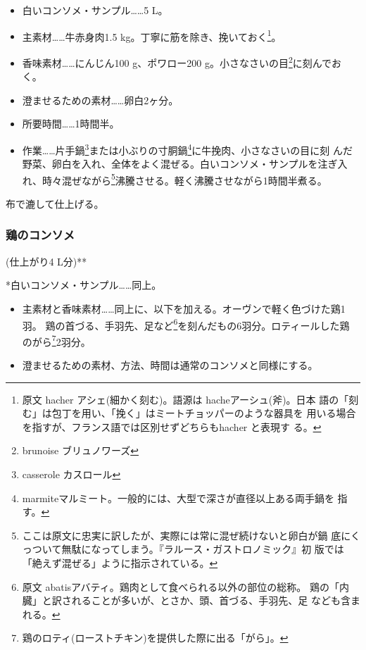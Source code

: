 \begin{itemize}
\item
  白いコンソメ・サンプル\ldots{}\ldots{}5 L。
\item
  主素材\ldots{}\ldots{}牛赤身肉1.5
  kg。丁寧に筋を除き、挽いておく\footnote{原文 hacher
    アシェ(細かく刻む)。語源は hacheアーシュ(斧)。日本
    語の「刻む」は包丁を用い、「挽く」はミートチョッパーのような器具を
    用いる場合を指すが、フランス語では区別せずどちらもhacher と表現す
    る。}。
\item
  香味素材\ldots{}\ldots{}にんじん100 g、ポワロー200
  g。小さなさいの目\footnote{brunoise ブリュノワーズ}に刻んでおく。
\item
  澄ませるための素材\ldots{}\ldots{}卵白2ヶ分。
\item
  所要時間\ldots{}\ldots{}1時間半。
\item
  作業\ldots{}\ldots{}片手鍋\footnote{casserole カスロール}または小ぶりの寸胴鍋\footnote{marmiteマルミート。一般的には、大型で深さが直径以上ある両手鍋を
    指す。}に牛挽肉、小さなさいの目に刻
  んだ野菜、卵白を入れ、全体をよく混ぜる。白いコンソメ・サンプルを注ぎ入
  れ、時々混ぜながら\footnote{ここは原文に忠実に訳したが、実際には常に混ぜ続けないと卵白が鍋
    底にくっついて無駄になってしまう。『ラルース・ガストロノミック』初
    版では「絶えず混ぜる」ように指示されている。}沸騰させる。軽く沸騰させながら1時間半煮る。
\end{itemize}

布で漉して仕上げる。

\hypertarget{ux9d8fux306eux30b3ux30f3ux30bdux30e1}{%
\subsubsection{鶏のコンソメ}\label{ux9d8fux306eux30b3ux30f3ux30bdux30e1}}

(仕上がり4 L分)**

*白いコンソメ・サンプル\ldots{}\ldots{}同上。

\begin{itemize}
\item
  主素材と香味素材\ldots{}\ldots{}同上に、以下を加える。オーヴンで軽く色づけた鶏1羽。
  鶏の首づる、手羽先、足など\footnote{原文
    abatisアバティ。鶏肉として食べられる以外の部位の総称。
    鶏の「内臓」と訳されることが多いが、とさか、頭、首づる、手羽先、足
    なども含まれる。}を刻んだもの6羽分。ロティールした鶏
  のがら\footnote{鶏のロティ(ローストチキン)を提供した際に出る「がら」。}2羽分。
\item
  澄ませるための素材、方法、時間は通常のコンソメと同様にする。
\end{itemize}
